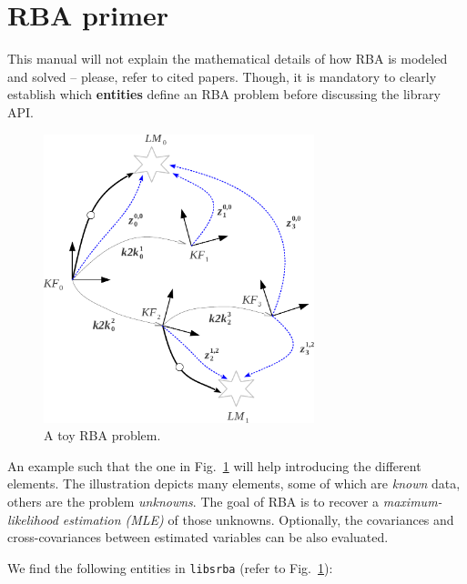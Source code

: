 \documentclass[a4paper,11pt]{article}
\begin{document}
\newpage
\section{RBA primer}
\label{sect:rba_primer}

This manual will not explain the mathematical details of how RBA is modeled and solved -- please, refer to cited papers.
Though, it is mandatory to clearly establish which \textbf{entities} define an RBA problem before discussing the library API.

\begin{figure}[h]
\centering
\includegraphics[width=0.7\textwidth]{imgs/srba_toy_problem.pdf} 
\caption{A toy RBA problem.}
\label{fig:rba.entities}
\end{figure}

An example such that the one in Fig.~\ref{fig:rba.entities} will help introducing the different elements.
The illustration depicts many elements, some of which are \emph{known} data, others are the problem \emph{unknowns}. 
The goal of RBA is to recover a \emph{maximum-likelihood estimation (MLE)} of those unknowns. Optionally, the covariances and 
cross-covariances between estimated variables can be also evaluated.

We find the following entities in \texttt{libsrba} (refer to Fig.~\ref{fig:rba.entities}):
\end{document}
